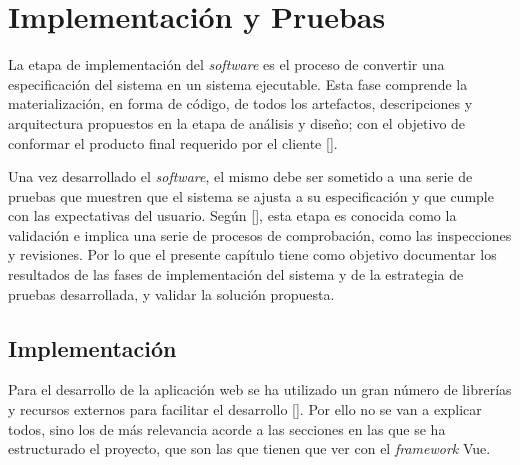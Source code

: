 \chapter{Implementación y Pruebas}\label{chapter:implementation}
La etapa de implementación del \textit{software} es el proceso de convertir una especificación del sistema en un sistema ejecutable. Esta fase comprende la materialización, en forma de código, de todos los artefactos, descripciones y arquitectura propuestos en la etapa de análisis y diseño; con el objetivo de conformar el producto final requerido por el cliente [\cite{91}].

Una vez desarrollado el \textit{software}, el mismo debe ser sometido a una serie de pruebas que muestren que el sistema se ajusta a su especificación y que cumple con las expectativas del usuario. Según [\cite{91}], esta etapa es conocida como la validación e implica una serie de procesos de comprobación, como las inspecciones y revisiones. Por lo que el presente capítulo tiene como objetivo documentar los resultados de las fases de implementación del sistema y de la estrategia de pruebas desarrollada, y validar la solución propuesta.


\section{Implementación}
Para el desarrollo de la aplicación web se ha utilizado un gran número de librerías y recursos externos para facilitar el desarrollo [\cite{47}]. Por ello no se van a explicar todos, sino los de más relevancia acorde a las secciones en las que se ha estructurado el proyecto, que son las que tienen que ver con el \textit{framework} Vue.


